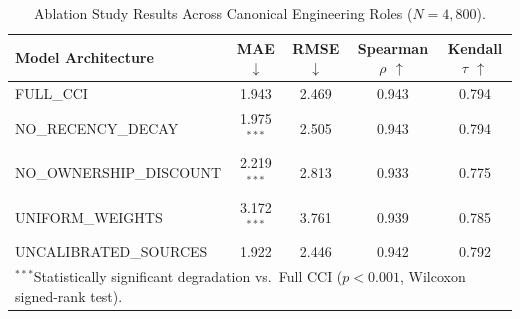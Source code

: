 \begin{table}[t]
\centering
\caption{Ablation Study Results Across Canonical Engineering Roles ($N=4{,}800$).}
\label{tab:ablation_study}
\small
\begin{tabular}{lcccc}
\toprule
\textbf{Model Architecture} & \textbf{MAE $\downarrow$} & \textbf{RMSE $\downarrow$} & \textbf{Spearman $\rho$ $\uparrow$} & \textbf{Kendall $\tau$ $\uparrow$} \\
\midrule
FULL\_CCI & 1.943 & 2.469 & 0.943 & 0.794 \\
NO\_RECENCY\_DECAY & 1.975$^{***}$ & 2.505 & 0.943 & 0.794 \\
NO\_OWNERSHIP\_DISCOUNT & 2.219$^{***}$ & 2.813 & 0.933 & 0.775 \\
UNIFORM\_WEIGHTS & 3.172$^{***}$ & 3.761 & 0.939 & 0.785 \\
UNCALIBRATED\_SOURCES & 1.922 & 2.446 & 0.942 & 0.792 \\
\bottomrule
\multicolumn{5}{l}{\footnotesize $^{***}$Statistically significant degradation vs.\ Full CCI ($p < 0.001$, Wilcoxon signed-rank test).}
\end{tabular}
\end{table}
